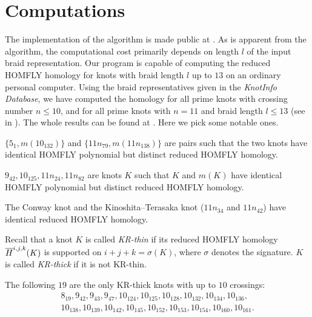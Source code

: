 \section{Computations} \label{sec:comptuations}

The implementation of the algorithm is made public at \cite{kr-calc}. As is apparent from the algorithm, the computational cost primarily depends on length $l$ of the input braid representation. Our program is capable of computing the reduced HOMFLY homology for knots with braid length $l$ up to $13$ on an ordinary personal computer. Using the braid representatives given in the \textit{KnotInfo Database}, we have computed the homology for all prime knots with crossing number $n \leq 10$, and for all prime knots with $n 
= 11$ and braid length $l \leq 13$ (see  in ). The whole results can be found at \cite{kr-calc}. Here we pick some notable ones. 

\begin{proposition}
    $\{5_1, m(10_{132})\}$ and $\{11n_{79}, m(11n_{138})\}$ are pairs such that the two knots have identical HOMFLY polynomial but distinct reduced HOMFLY homology. 
\end{proposition}

\begin{proposition}
    $9_{42}, 10_{125}, 11n_{24}, 11n_{82}$ are knots $K$ such that $K$ and $m(K)$ have identical HOMFLY polynomial but distinct reduced HOMFLY homology. 
\end{proposition}

\begin{proposition}[\cite{MV08}]
    The Conway knot and the Kinoshita--Terasaka knot \textup{(}$11n_{34}$ and $11n_{42}$\textup{)} have identical reduced HOMFLY homology.
\end{proposition}

Recall that a knot $K$ is called \textit{KR-thin} if its reduced HOMFLY homology $\overline{H}^{i, j, k}(K)$ is supported on $i + j + k = \sigma(K)$, where $\sigma$ denotes the signature. $K$ is called \textit{KR-thick} if it is not KR-thin. 

\begin{proposition} \label{prop:KR-thick-10}
    The following $19$ are the only KR-thick knots with up to $10$ crossings:
    \begin{gather*}
        8_{19}, 9_{42}, 9_{43}, 9_{47}, 10_{124}, 
        10_{125}, 10_{128}, 10_{132}, 10_{134}, 10_{136}, \\
        10_{138}, 10_{139}, 10_{142}, 10_{145}, 10_{152}, 
        10_{153}, 10_{154}, 10_{160}, 10_{161}.
    \end{gather*}
\end{proposition}

